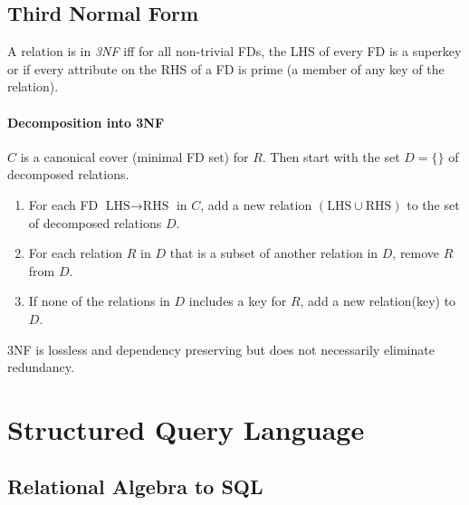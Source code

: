 \documentclass[twocolumn,english]{article}
\begin{document}
\subsection{Third Normal Form}

A relation is in \emph{3NF} iff for all non-trivial FDs, the LHS of
every FD is a superkey or if every attribute on the RHS of a FD is
prime (a member of any key of the relation).


\paragraph{Decomposition into 3NF}

$C$ is a canonical cover (minimal FD set) for $R$. Then start with
the set $D=\{\}$ of decomposed relations. 
\begin{enumerate}
\item For each FD $\mbox{LHS}\rightarrow\mbox{RHS}$ in $C$, add a new
relation $\left(\mbox{LHS}\cup\mbox{RHS}\right)$ to the set of decomposed
relations $D$. 
\item For each relation $R$ in $D$ that is a subset of another relation
in $D$, remove $R$ from $D$. 
\item If none of the relations in $D$ includes a key for $R$, add a new
relation(key) to $D$. 
\end{enumerate}
3NF is lossless and dependency preserving but does not necessarily
eliminate redundancy.


\section{Structured Query Language}


\subsection{Relational Algebra to SQL}
\end{document}
